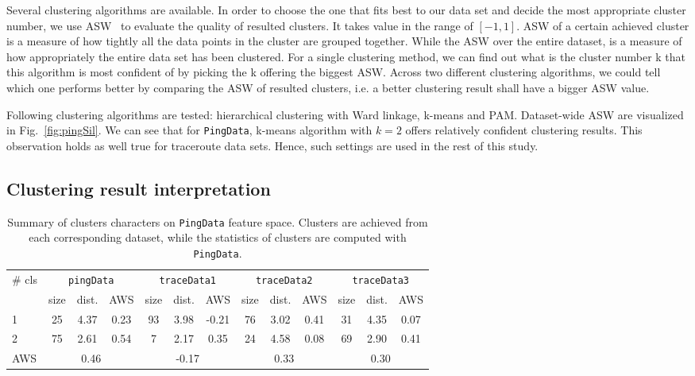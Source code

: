 Several clustering algorithms are available. 
In order to choose the one that fits best to our data set and decide the most appropriate cluster number, we use \acf{ASW}~\cite{Rousseeuw1987} to evaluate the quality of resulted clusters. 
It takes value in the range of $[-1,1]$. 
\ac{ASW} of a certain achieved cluster is a measure of how tightly all the data points in the cluster are grouped together. 
While the \ac{ASW} over the entire dataset, is a measure of how appropriately the entire data set has been clustered. For a single clustering method, we can find out what is the cluster number k that this algorithm is most confident of by picking the k offering the biggest \ac{ASW}. Across two different clustering algorithms, we could tell which one performs better by comparing the \ac{ASW} of resulted clusters, i.e. a better clustering result shall have a bigger \ac{ASW} value.

Following clustering algorithms are tested: hierarchical clustering with Ward linkage, k-means and \ac{PAM}.
Dataset-wide \ac{ASW} are visualized in Fig.~\ref{fig:pingSil}. We can see that for \texttt{PingData}, k-means algorithm with $k=2$ offers relatively confident clustering results. 
This observation holds as well true for traceroute data sets.
Hence, such settings are used in the rest of this study.


\subsection{Clustering result interpretation}

\begin{table}[!htb]
\centering
\footnotesize
\setlength{\tabcolsep}{0.5em}
\begin{tabular}{l|ccc|ccc|ccc|ccc}
\toprule
\multirow{2}{*}{\# cls} & \multicolumn{3}{c|}{\texttt{pingData}} & \multicolumn{3}{c|}{\texttt{traceData1}} & \multicolumn{3}{c|}{\texttt{traceData2}} & \multicolumn{3}{c}{\texttt{traceData3}}\\
& size & dist. & AWS & size & dist. & AWS & size & dist. & AWS & size& dist. & AWS\\
\midrule
1 & 25 & 4.37 & 0.23 & 93 & 3.98 & -0.21 & 76 & 3.02 & 0.41 & 31 & 4.35 & 0.07\\
2 & 75 & 2.61 & 0.54 & 7  & 2.17 & 0.35  & 24 & 4.58 & 0.08 & 69 & 2.90 & 0.41\\ 
\midrule
AWS &\multicolumn{3}{c|}{0.46} & \multicolumn{3}{c|}{-0.17} & \multicolumn{3}{c|}{0.33} & \multicolumn{3}{c}{0.30}\\
\bottomrule
\end{tabular}
\caption{Summary of clusters characters on \texttt{PingData} feature space. Clusters are achieved from each corresponding dataset, while the statistics of clusters are computed with \texttt{PingData}.}
\label{tab:summary_cls}
\end{table}

